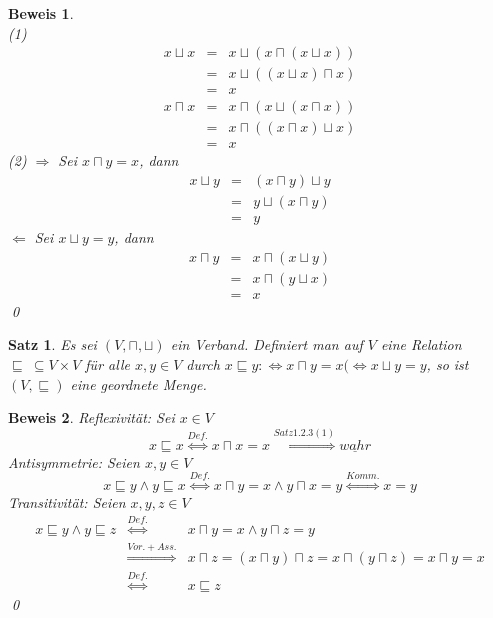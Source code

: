 \documentclass[ngerman]{scrartcl}
\theoremstyle{custom}
\newtheorem{ms}[mdef]{Satz}
\newtheorem*{bw}{Beweis}
\newcommand{\0}{\mathbf{0}}
\newcommand{\1}{\mathbf{L}}
\begin{document}
\begin{bw}~\\
(1)
\begin{eqnarray*}
x \sqcup x &=& x \sqcup (x \sqcap (x \sqcup x))\\
&=& x \sqcup ((x \sqcup x) \sqcap x)\\
&=& x
\end{eqnarray*}
\begin{eqnarray*}
x \sqcap x &=& x \sqcap (x \sqcup (x \sqcap x)) \\
&=& x \sqcap ((x \sqcap x) \sqcup x) \\
&=& x
\end{eqnarray*} 
(2) 
$\Rightarrow$ Sei $x \sqcap y = x$, dann
\begin{eqnarray*}
x \sqcup y &=& (x \sqcap y) \sqcup y \\
&=& y \sqcup (x \sqcap y) \\
&=& y
\end{eqnarray*}
$\Leftarrow$ Sei $x \sqcup y = y$, dann
\begin{eqnarray*}
x \sqcap y &=& x \sqcap (x \sqcup y) \\
&=& x \sqcap (y \sqcup x) \\
&=& x
\end{eqnarray*}
\qed
\end{bw}

\begin{ms} Es sei $(V, \sqcap, \sqcup)$ ein Verband. Definiert man auf
  $V$ eine Relation $\sqsubseteq ~\subseteq V \times V$ f\"ur alle
  $x,y \in V$ durch $x \sqsubseteq y :\Longleftrightarrow x \sqcap y =
  x (\Longleftrightarrow x \sqcup y = y$, so ist $(V, \sqsubseteq)$
  eine geordnete Menge.
\end{ms}

\begin{bw}
Reflexivit\"at: Sei $x \in V$
\begin{equation*}
x \sqsubseteq x \stackrel{Def.}{\Leftrightarrow} x \sqcap x = x
\stackrel{Satz 1.2.3 (1)}{\Leftrightarrow}
\underline{wahr}
\end{equation*}
Antisymmetrie: Seien $x, y \in V$
\begin{equation*}
x \sqsubseteq y \wedge y \sqsubseteq x \stackrel{Def.}{\Leftrightarrow} x \sqcap y = x
\wedge y \sqcap x = y \stackrel{Komm.}{\Leftrightarrow} x= y
\end{equation*}
Transitivit\"at: Seien $x,y, z \in V$
\begin{eqnarray*}
x \sqsubseteq y \wedge y \sqsubseteq z
&\stackrel{Def.}{\Leftrightarrow}& x \sqcap y = x \wedge y \sqcap z =
y \\
&\stackrel{Vor. + Ass.}{\Rightarrow}& x \sqcap z = (x \sqcap y) \sqcap z
= x \sqcap (y \sqcap z) = x \sqcap y = x \\
&\stackrel{Def.}{\Leftrightarrow}& x \sqsubseteq z
\end{eqnarray*}
\qed
\end{bw}
\end{document}
